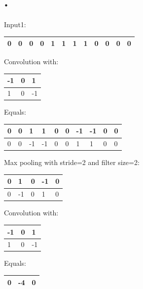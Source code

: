 \documentclass{article}
\begin{document}
\section{.}

Input1:

\begin{tabular}{|p{0.2in}|p{0.2in}|p{0.2in}|p{0.2in}|p{0.2in}|p{0.2in}|p{0.2in}|p{0.2in}|p{0.2in}|p{0.2in}|p{0.2in}|p{0.2in}|} \hline 
0 & 0 & 0 & 0 & 1 & 1 & 1 & 1 & 0 & 0 & 0 & 0 \\ \hline 
\end{tabular}

Convolution with: 

\begin{tabular}{|p{0.3in}|p{0.3in}|p{0.3in}|} \hline 
-1 & 0 & 1 \\ \hline 
1 & 0 & -1 \\ \hline 
\end{tabular}



 

 Equals:

\begin{tabular}{|p{0.3in}|p{0.3in}|p{0.3in}|p{0.3in}|p{0.3in}|p{0.3in}|p{0.3in}|p{0.3in}|p{0.3in}|p{0.3in}|} \hline 
0 & 0 & 1 & 1 & 0 & 0 & -1 & -1 & 0 & 0 \\ \hline 
0 & 0 & -1 & -1 & 0 & 0 & 1 & 1 & 0 & 0 \\ \hline 
\end{tabular}

Max pooling with stride=2 and filter size=2:

  

\begin{tabular}{|p{0.5in}|p{0.5in}|p{0.5in}|p{0.5in}|p{0.5in}|} \hline 
0 & 1 & 0 & -1 & 0 \\ \hline 
0 & -1 & 0 & 1 & 0 \\ \hline 
\end{tabular}

 

 Convolution with:

\begin{tabular}{|p{0.4in}|p{0.4in}|p{0.4in}|} \hline 
-1 & 0 & 1 \\ \hline 
1 & 0 & -1 \\ \hline 
\end{tabular}



 Equals:  

\begin{tabular}{|p{0.5in}|p{0.5in}|p{0.5in}|} \hline 
0 & -4 & 0 \\ \hline 
\end{tabular}
\end{document}
